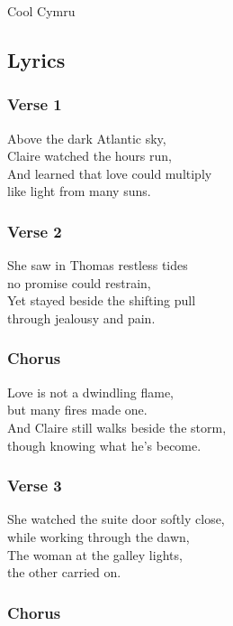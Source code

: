 Cool Cymru

\subsection{Lyrics}\label{lyrics-2}

\subsubsection{Verse 1}\label{verse-1-1}

Above the dark Atlantic sky,\\
Claire watched the hours run,\\
And learned that love could multiply\\
like light from many suns.

\subsubsection{Verse 2}\label{verse-2-1}

She saw in Thomas restless tides\\
no promise could restrain,\\
Yet stayed beside the shifting pull\\
through jealousy and pain.

\subsubsection{Chorus}\label{chorus-3}

Love is not a dwindling flame,\\
but many fires made one.\\
And Claire still walks beside the storm,\\
though knowing what he's become.

\subsubsection{Verse 3}\label{verse-3}

She watched the suite door softly close,\\
while working through the dawn,\\
The woman at the galley lights,\\
the other carried on.

\subsubsection{Chorus}\label{chorus-4}


